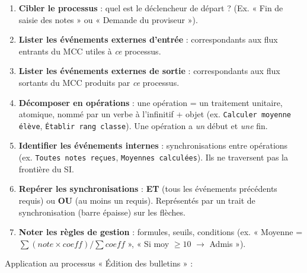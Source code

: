 \documentclass[11pt]{article}
\begin{document}
\begin{methode}
\begin{enumerate}
    \item \textbf{Cibler le processus} : quel est le déclencheur de départ ? (Ex. « Fin de saisie des notes » ou « Demande du proviseur »).
    \item \textbf{Lister les événements externes d'entrée} : correspondants aux flux entrants du MCC utiles à \emph{ce} processus.
    \item \textbf{Lister les événements externes de sortie} : correspondants aux flux sortants du MCC produits par \emph{ce} processus.
    \item \textbf{Décomposer en opérations} : une opération = un traitement unitaire, atomique, nommé par un verbe à l'infinitif + objet (ex. \texttt{Calculer moyenne élève}, \texttt{Établir rang classe}). Une opération a \emph{un} début et \emph{une} fin.
    \item \textbf{Identifier les événements internes} : synchronisations entre opérations (ex. \texttt{Toutes notes reçues}, \texttt{Moyennes calculées}). Ils ne traversent pas la frontière du SI.
    \item \textbf{Repérer les synchronisations} : \textbf{ET} (tous les événements précédents requis) ou \textbf{OU} (au moins un requis). Représentés par un trait de synchronisation (barre épaisse) sur les flèches.
    \item \textbf{Noter les règles de gestion} : formules, seuils, conditions (ex. « Moyenne = $\sum(note \times coeff) / \sum coeff$ », « Si moy $\ge 10$ $\rightarrow$ Admis »).
\end{enumerate}
\end{methode}

Application au processus « Édition des bulletins » :
\end{document}
